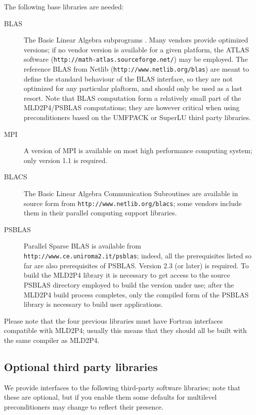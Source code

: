 The following base libraries are needed: 
\begin{description}
\item[BLAS] The Basic Linear Algebra subprograms \cite{blas3,blas3,blas1}.
  Many vendors provide optimized versions; if no vendor version is
  available for a given platform, the  ATLAS software
  (\verb!http://math-atlas.sourceforge.net/!)
  may be employed.  The reference BLAS from Netlib
  (\verb|http://www.netlib.org/blas|) are meant to define the standard
  behaviour of the BLAS interface, so they are not optimized for any
  particular plaftorm, and should only be used as a last
  resort. Note that BLAS computation form a relatively small part of
  the MLD2P4/PSBLAS computations; they are however critical when using
  preconditioners based on the UMFPACK or SuperLU third party
  libraries.  
\item[MPI] A version of MPI \cite{MPI2,MPI1} is available on most high performance
  computing system; only version 1.1 is required.
\item[BLACS] The Basic Linear Algebra Communication Subroutines
  \cite{BLACS} are available in source form from \verb|http://www.netlib.org/blacs|;
  some vendors  include them in their parallel computing
  support libraries.
 \item[PSBLAS] Parallel Sparse BLAS \cite{PSBLASGUIDE,psblas_00} is
  available from \\ \verb|http://www.ce.uniroma2.it/psblas|; indeed, all the
  prerequisites listed so far are also prerequisites of PSBLAS.
  Version 2.3 (or later) is required. To build the MLD2P4 library
  it is necessary to get access to
  the source PSBLAS directory employed to build the version under use; after
  the MLD2P4 build process completes, only the compiled form of the
  PSBLAS library is necessary to build user applications.
\end{description}

Please note that the four previous libraries must have Fortran
interfaces compatible with MLD2P4;
usually this means that they should all be built with the same
compiler as MLD2P4.

\subsection{Optional third party libraries}

We provide interfaces to the following third-party software libraries;
note that these are optional, but if you enable them some defaults
for multilevel preconditioners may change to reflect their presence. 

